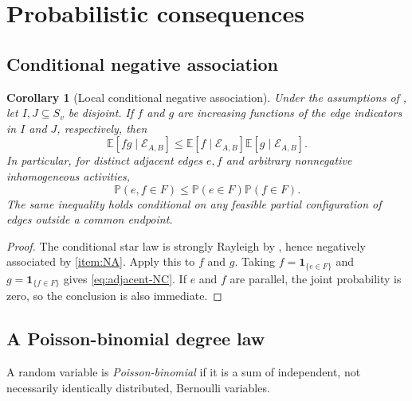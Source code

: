 \documentclass[11pt]{article}
\numberwithin{equation}{section}
\newtheorem{corollary}[theorem]{Corollary}
\newcommand{\bbP}{\mathbb P}
\newcommand{\bbE}{\mathbb E}
\newcommand{\ind}{\mathbf 1}
\begin{document}
\section{Probabilistic consequences}\label{sec:consequences}

\subsection{Conditional negative association}

\begin{corollary}[Local conditional negative association]\label{cor:local-NA}
Under the assumptions of , let $I,J\subseteq S_v$ be disjoint.  If $f$ and $g$ are increasing functions of the edge indicators in $I$ and $J$, respectively, then
\begin{equation}\label{eq:conditional-NA}
 \bbE[fg\mid\mathcal E_{A,B}]
 \leq
 \bbE[f\mid\mathcal E_{A,B}]
 \bbE[g\mid\mathcal E_{A,B}].
\end{equation}
In particular, for distinct adjacent edges $e,f$ and arbitrary nonnegative inhomogeneous activities,
\begin{equation}\label{eq:adjacent-NC}
 \bbP(e,f\in F)
 \leq
 \bbP(e\in F)\bbP(f\in F).
\end{equation}
The same inequality holds conditional on any feasible partial configuration of edges outside a common endpoint.
\end{corollary}

\begin{proof}
The conditional star law is strongly Rayleigh by , hence negatively associated by \ref{item:NA}.  Apply this to $f$ and $g$.  Taking $f=\ind_{\{e\in F\}}$ and $g=\ind_{\{f\in F\}}$ gives \eqref{eq:adjacent-NC}.  If $e$ and $f$ are parallel, the joint probability is zero, so the conclusion is also immediate.
\end{proof}

\subsection{A Poisson-binomial degree law}

A random variable is \emph{Poisson-binomial} if it is a sum of independent, not necessarily identically distributed, Bernoulli variables.
\end{document}

